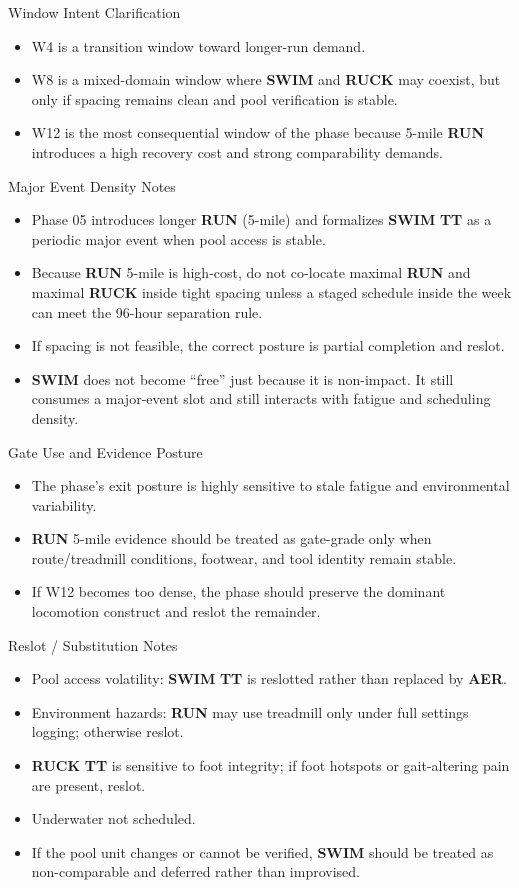 \documentclass[10pt]{article}
\begin{document}
Window Intent Clarification

\begin{itemize}
\item W4 is a transition window toward longer-run demand.
\item W8 is a mixed-domain window where \textbf{SWIM} and \textbf{RUCK} may coexist, but only if spacing remains clean and pool verification is stable.
\item W12 is the most consequential window of the phase because 5-mile \textbf{RUN} introduces a high recovery cost and strong comparability demands.
\end{itemize}

Major Event Density Notes

\begin{itemize}
\item Phase 05 introduces longer \textbf{RUN} (5-mile) and formalizes \textbf{SWIM} \textbf{TT} as a periodic major event when pool access is stable.
\item Because \textbf{RUN} 5-mile is high-cost, do not co-locate maximal \textbf{RUN} and maximal \textbf{RUCK} inside tight spacing unless a staged schedule inside the week can meet the 96-hour separation rule.
\item If spacing is not feasible, the correct posture is partial completion and reslot.
\item \textbf{SWIM} does not become “free” just because it is non-impact. It still consumes a major-event slot and still interacts with fatigue and scheduling density.
\end{itemize}

Gate Use and Evidence Posture

\begin{itemize}
\item The phase’s exit posture is highly sensitive to stale fatigue and environmental variability.
\item \textbf{RUN} 5-mile evidence should be treated as gate-grade only when route/treadmill conditions, footwear, and tool identity remain stable.
\item If W12 becomes too dense, the phase should preserve the dominant locomotion construct and reslot the remainder.
\end{itemize}

Reslot / Substitution Notes

\begin{itemize}
\item Pool access volatility: \textbf{SWIM} \textbf{TT} is reslotted rather than replaced by \textbf{AER}.
\item Environment hazards: \textbf{RUN} may use treadmill only under full settings logging; otherwise reslot.
\item \textbf{RUCK} \textbf{TT} is sensitive to foot integrity; if foot hotspots or gait-altering pain are present, reslot.
\item Underwater not scheduled.
\item If the pool unit changes or cannot be verified, \textbf{SWIM} should be treated as non-comparable and deferred rather than improvised.
\end{itemize}
\end{document}
